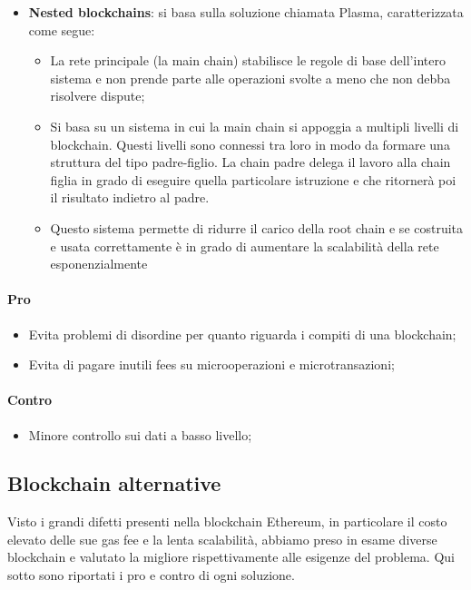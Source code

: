     \begin{itemize}
        \item \textbf{Nested blockchains}: si basa sulla soluzione chiamata Plasma, caratterizzata come segue:
        \begin{itemize}
            \item La rete principale (la main chain) stabilisce le regole di base dell'intero sistema e non prende parte alle operazioni svolte a meno che non debba risolvere dispute;
            \item Si basa su un sistema in cui la main chain si appoggia a multipli livelli di blockchain\glo{}. Questi livelli sono connessi tra loro in modo da formare una struttura del tipo padre-figlio. 
            La chain padre delega il lavoro alla chain figlia in grado di eseguire quella particolare istruzione e che ritornerà poi il risultato indietro al padre.
            \item Questo sistema permette di ridurre il carico della root chain e se costruita e usata correttamente è in grado di aumentare la scalabilità della rete esponenzialmente     
        \end{itemize}
    \end{itemize}
    \paragraph{Pro}
    \begin{itemize}
        \item Evita problemi di disordine per quanto riguarda i compiti di una blockchain;
        \item Evita di pagare inutili fees su microoperazioni e microtransazioni;
    \end{itemize}
    \paragraph{Contro}
    \begin{itemize}
        \item Minore controllo sui dati a basso livello;        
    \end{itemize}

	\subsection{Blockchain alternative}
	Visto i grandi difetti presenti nella blockchain\glo{} Ethereum\glo{}, in particolare il costo elevato delle sue gas fee e la lenta scalabilità, abbiamo preso in esame diverse blockchain\glo{} e valutato la migliore 
	rispettivamente alle esigenze del problema. Qui sotto sono riportati i pro e contro di ogni soluzione.
